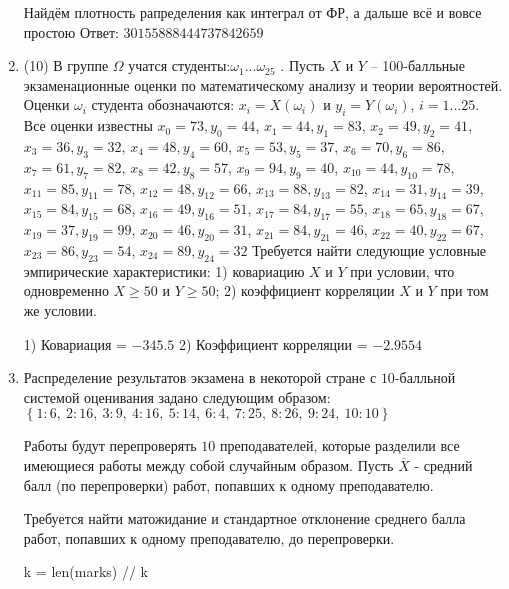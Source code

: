 \documentclass[a4paper,12pt]{article}
\begin{document}
\begin{enumerate}
Найдём плотность рапределения как интеграл от ФР, а дальше всё и вовсе простою Ответ: $30155888444737842659$


\item


(10) В группе $\Omega$ учатся студенты:$\omega _{1}...\omega _{25}$ . Пусть $X$ и $Y$ – 100-балльные экзаменационные оценки по
математическому анализу и теории вероятностей. Оценки $\omega _{i}$ студента обозначаются: $x _{i} = X(\omega _{i})$ и $y _{i} = Y(\omega _{i})$, $i = 1...25$. Все оценки известны
$x _{0} = 73, y _{0} = 44$, $x _{1} = 44, y _{1} = 83$, $x _{2} = 49, y _{2} = 41$, $x _{3} = 36, y _{3} = 32$, $x _{4} = 48, y _{4} = 60$, $x _{5} = 53, y _{5} = 37$, $x _{6} = 70, y _{6} = 86$, $x _{7} = 61, y _{7} = 82$, $x _{8} = 42, y _{8} = 57$, $x _{9} = 94, y _{9} = 40$, $x _{10} = 44, y _{10} = 78$, $x _{11} = 85, y _{11} = 78$, $x _{12} = 48, y _{12} = 66$, $x _{13} = 88, y _{13} = 82$, $x _{14} = 31, y _{14} = 39$, $x _{15} = 84, y _{15} = 68$, $x _{16} = 49, y _{16} = 51$, $x _{17} = 84, y _{17} = 55$, $x _{18} = 65, y _{18} = 67$, $x _{19} = 37, y _{19} = 99$, $x _{20} = 46, y _{20} = 31$, $x _{21} = 84, y _{21} = 46$, $x _{22} = 40, y _{22} = 67$, $x _{23} = 86, y _{23} = 54$, $x _{24} = 89, y _{24} = 32$
Требуется
найти следующие условные эмпирические характеристики: 1) ковариацию $X$ и $Y$ при условии, что одновременно $X \geqslant 50$
 и $Y \geqslant 50$; 2) коэффициент корреляции $X$ и $Y$ при том же условии.




1) Ковариация = $-345.5$
2) Коэффициент корреляции = $-2.9554$


\item

    
    	Распределение результатов экзамена в некоторой стране с $10$-балльной системой оценивания задано следующим образом:
    	$\left\{ 1 : 6, \  2 : 16, \  3 : 9, \  4 : 16, \  5 : 14, \  6 : 4, \  7 : 25, \  8 : 26, \  9 : 24, \  10 : 10\right\}$

	Работы будут перепроверять $10$ преподавателей, которые разделили все имеющиеся работы между собой случайным образом. Пусть $\overline{X}$ - средний балл (по перепроверки) работ, попавших к одному преподавателю.

	Требуется найти матожидание и стандартное отклонение среднего балла работ, попавших к одному преподавателю, до перепроверки.
    


    


    k = len(marks) // k


\end{enumerate}
\end{document}
